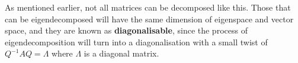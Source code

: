 \documentclass{article}
\theoremstyle{definition}
\begin{document}
\bigskip

\noindent As mentioned earlier, not all matrices can be decomposed like this. Those that can be eigendecomposed will have the same dimension of eigenspace and vector space, and they are known as \textbf{diagonalisable}, since the process of eigendecomposition will turn into a diagonalisation with a small twist of $Q^{-1} A Q = \Lambda$ where $\Lambda$ is a diagonal matrix.
\end{document}
